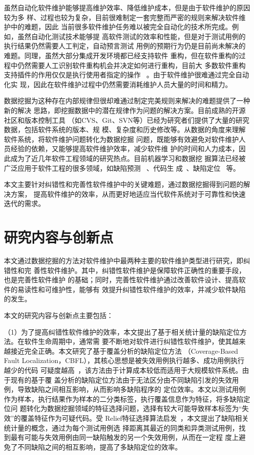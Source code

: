 虽然自动化软件维护能够提高维护效率、降低维护成本，但是由于软件维护的原因较为多
样、过程也较为复杂，目前很难制定一套完整而严密的规则来解决软件维护中的难题，因此
当前很多软件维护任务难以被完全自动化的技术所完成。例如，虽然自动化测试技术能够提
高软件测试的效率和性能，但是对于测试用例的执行结果仍然需要人工判定，自动预言测试
用例的预期行为仍是目前尚未解决的难题。同理，虽然大部分集成开发环境都已经支持软件
重构，但在软件重构的过程中仍然需要人工识别软件重构机会并决定如何进行重构，目前大
多数软件重构支持插件的作用仅仅是执行使用者指定的操作
~\cite{fowler1999refactoring, murphy2012we}。由于软件维护很难通过完全自动化实
现，因此在软件维护过程中仍然需要消耗维护人员大量的时间和精力。

数据挖掘为这种存在内部规律但很却难通过制定完美规则来解决的难题提供了一种新的解决
思路，即挖掘数据中的潜在规律作为问题的解决方案。目前成熟的开源社区和版本控制工具
（如CVS、Git、SVN等）已经为研究者们提供了大量的研究数据，包括软件系统的版本、规
模、复杂度和历史修改等。从数据的角度来理解软件系统，将软件维护问题转化为数据挖掘
问题，既能够有效避免对软件维护人员经验的依赖，又能够提高软件维护效率，减少软件维
护的时间和人力成本，因此成为了近几年软件工程领域的研究热点。目前机器学习和数据挖
掘算法已经被广泛应用于软件工程的很多领域，如缺陷预测
~\cite{menzies2007data,drown2009evolutionary,khoshgoftaar2010attribute}、代码生
成~\cite{maddison2014structured,ling2016latent}、缺陷定位
~\cite{malcov2013,nnfault2013}等。

本文主要针对纠错性和完善性软件维护中的关键难题，通过数据挖掘得到问题的解决方案，
提高软件维护的效率，从而更好地适应当代软件系统对于可靠性和快速迭代的需求。

\section{研究内容与创新点}
本文通过数据挖掘的方法对软件维护中最两种主要的软件维护类型进行研究，即纠错性和完
善性软件维护。其中，纠错性软件维护是保障软件正确性的重要手段，也是完善性软件维护
的基础；同时，完善性软件维护通过改善软件设计、提高软件的易读性和可维护性，能够有
效提升纠错性软件维护的效率，并减少软件缺陷的发生。

本文的研究内容与创新点主要包括：

（1）为了提高纠错性软件维护的效率，本文提出了基于相关统计量的缺陷定位方法。在软件生命周期中，通常需
要不断地对软件进行纠错性软件维护，使其越来越接近完全正确。本文研究了基于覆盖分析的缺陷定位方法
（Coverage-Based Fault Localization，CBFL），其核心思想是被失效用例执行越多、成功用例执行越少的代码
可疑度越高~\cite{jones2005empirical}，该方法由于计算成本较低而适用于大规模软件系统。由于现有的基于覆
盖分析的缺陷定位方法由于无法区分由不同缺陷引发的失效用例，导致缺陷之间相互影响，从而影响多缺陷程序的
定位效率。本文以测试用例作为样本，执行结果作为样本的二分类标签，执行覆盖信息作为特征，将多缺陷定位问
题转化为数据挖掘领域的特征选择问题，选择有较大可能导致样本标签为``失效''的覆盖特征作为可疑代码。受
Relief特征选择算法启发~\cite{kira1992feature}，本文提出了缺陷相关统计量的概念，通过为每个测试用例选
择距离其最近的同类和异类测试用例，找到最有可能与失效用例由同一缺陷触发的另一个失效用例，从而在一定程
度上避免了不同缺陷之间的相互影响，提高了多缺陷定位的效率。

